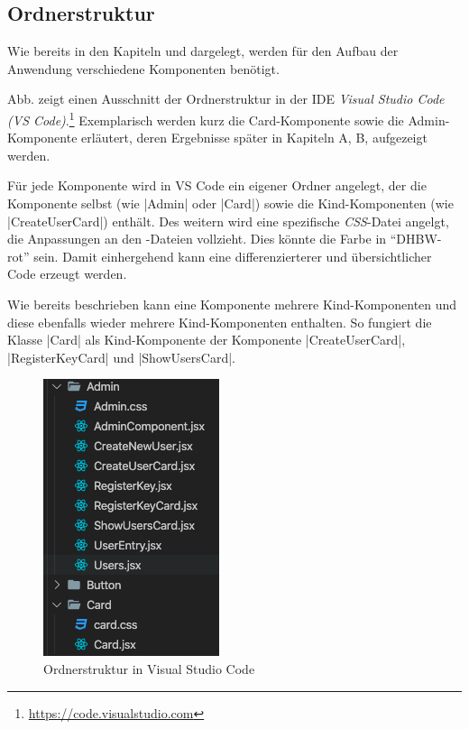 
\subsection{Ordnerstruktur}
\label{ssec:Ordnerstruktur}

Wie bereits in den Kapiteln  und  dargelegt, werden für den Aufbau der Anwendung verschiedene Komponenten benötigt. 

Abb.  zeigt einen Ausschnitt der Ordnerstruktur in der \ac{IDE} \emph{Visual Studio Code (VS Code)}.\footnote{\url{https://code.visualstudio.com}}
Exemplarisch werden kurz die Card-Komponente sowie die Admin-Komponente erläutert, deren Ergebnisse später in Kapiteln A, B, aufgezeigt werden. 

Für jede Komponente wird in VS Code ein eigener Ordner angelegt, der die Komponente selbst (wie \zb \jinline|Admin| oder \jinline|Card|) sowie die Kind-Komponenten (wie \zb \jinline|CreateUserCard|) enthält.  
Des weitern wird eine spezifische \emph{\acs{CSS}}-Datei angelgt, die Anpassungen an den -Dateien vollzieht. 
Dies könnte \zb die Farbe in \enquote{DHBW-rot} sein. 
Damit einhergehend kann eine differenzierterer und übersichtlicher Code erzeugt werden. 

Wie bereits beschrieben kann eine Komponente mehrere Kind-Komponenten und diese ebenfalls wieder mehrere Kind-Komponenten enthalten. 
So fungiert die Klasse \jinline|Card| \ua als Kind-Komponente der Komponente \jinline|CreateUserCard|, \jinline|RegisterKeyCard| und \jinline|ShowUsersCard|. 

\begin{figure}[!htb]
	\centering
	\includegraphics[height=0.4\textwidth, keepaspectratio]{img/client/ordnerStruktur.png}
	\captionsetup{justification=centering, format=plain}
	\caption[Ordnerstruktur in Visual Studio Code]{Ordnerstruktur in Visual Studio Code \\ \quelleScreenshot}
	\label{fig:OrdnerstrukturVSCode}
\end{figure}
